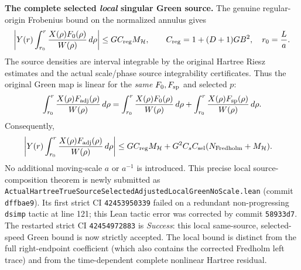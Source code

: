 \documentclass[11pt]{amsart}
\newcommand{\HH}{\mathcal H}
\begin{document}
\medskip
\noindent\textbf{The complete selected \emph{local} singular Green source.}
The genuine regular-origin Frobenius bound on the normalized annulus gives
\[
 \left|Y(r)\int_{r_0}^{r}
     \frac{X(\rho)F_0(\rho)}{W(\rho)}\,d\rho\right|
 \le G C_{\rm reg} M_{\HH},\qquad
 C_{\rm reg}=1+(D+1)GB^2,\quad r_0=\frac La.
\]
The source densities are interval integrable by the original Hartree
Riesz estimates and the actual scale/phase source integrability
certificates. Thus the original Green map is linear for the
\emph{same} \(F_0,F_{\rm sp}\) and selected \(p\):
\[
 \int_{r_0}^{r}\frac{X(\rho)F_{\rm adj}(\rho)}{W(\rho)}\,d\rho
 =
 \int_{r_0}^{r}\frac{X(\rho)F_0(\rho)}{W(\rho)}\,d\rho+
 \int_{r_0}^{r}\frac{X(\rho)F_{\rm sp}(\rho)}{W(\rho)}\,d\rho.
\]
Consequently,
\begin{align}
 \left|Y(r)\int_{r_0}^{r}
       \frac{X(\rho)F_{\rm adj}(\rho)}{W(\rho)}\,d\rho\right|
 &\le GC_{\rm reg}M_{\HH}
       +G^2C_sC_{\rm sel}
          (N_{\mathrm{Fredholm}}+M_{\HH}).
 \label{eq:true-adjusted-hartree-local-green}
\end{align}
No additional moving-scale \(a\) or \(a^{-1}\) is introduced.
This precise local source-composition theorem is newly submitted as
\texttt{ActualHartreeTrueSourceSelectedAdjustedLocalGreenNoScale.lean}
(commit \texttt{dffbae9}). Its first strict CI \texttt{42453950339}
failed on a redundant non-progressing \texttt{dsimp} tactic at line 121;
this Lean tactic error was corrected by commit \texttt{58933d7}.
The restarted strict CI \texttt{42454972883}
is \emph{Success}: this local same-source, selected-speed Green bound
is now strictly accepted.
The local bound is distinct from the full right-endpoint coefficient
(which also contains the corrected Fredholm left trace) and from the
time-dependent complete nonlinear Hartree residual.
\end{document}
